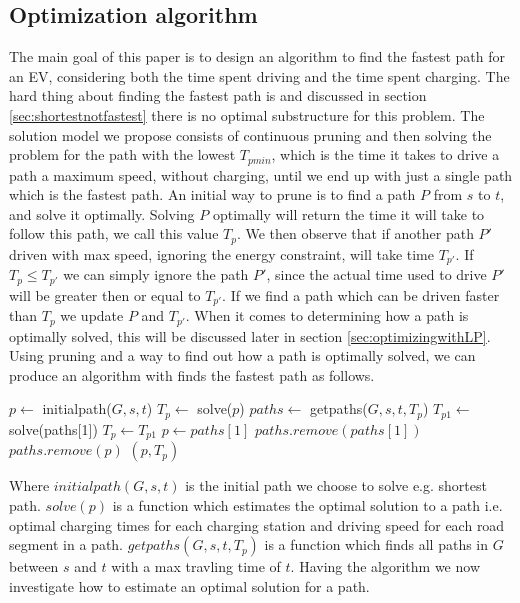 \subsection{Optimization algorithm}
The main goal of this paper is to design an algorithm to find the fastest path for an EV, considering both the time spent driving and the time spent charging. The hard thing about finding the fastest path is and discussed in section \ref{sec:shortestnotfastest} there is no optimal substructure for this problem. The solution model we propose consists of continuous pruning and then solving the problem for the path with the lowest $T_{pmin}$, which is the time it takes to drive a path a maximum speed, without charging, until we end up with just a single path which is the fastest path. An initial way to prune is to find a path $P$ from $s$ to $t$, and solve it optimally. Solving $P$ optimally will return the time it will take to follow this path, we call this value $T_p$. We then observe that if another path $P'$ driven with max speed, ignoring the energy constraint, will take time $T_{p'}$. If $T_p \leq T_{p'}$ we can simply ignore the path $P'$, since the actual time used to drive $P'$ will be greater then or equal to $T_{p'}$. If we find a path which can be driven faster than $T_p$ we update $P$ and $T_{p'}$. When it comes to determining how a path is optimally solved, this will be discussed later in section \ref{sec:optimizingwithLP}. Using pruning and a way to find out how a path is optimally solved, we can produce an algorithm with finds the fastest path as follows. 
\begin{algorithmic}
    \State $p \gets$ initialpath($G,s,t$)
    \State $T_p \gets$ solve($p$)
    \State $paths \gets$ getpaths($G,s,t,T_p$)
    \Repeat 
    	\State $T_{p1} \gets$ solve(paths[1])
    		\State $T_p \gets T_{p1}$
    		\State $p \gets paths[1]$ 
    	\EndIf 
    	\State $paths.remove(paths[1])$
    			\State $paths.remove(p)$
    		\EndIf
    	\EndFor
    \State \Return $(p, T_p)$
\EndFunction
\end{algorithmic}
Where $initialpath(G,s,t)$ is the initial path we choose to solve e.g. shortest path. $solve(p)$ is a function which estimates the optimal solution to a path i.e. optimal charging times for each charging station and driving speed for each road segment in a path. $getpaths(G,s,t,T_p)$ is a function which finds all paths in $G$ between $s$ and $t$ with a max travling time of $t$. Having the algorithm we now investigate how to estimate an optimal solution for a path.     

